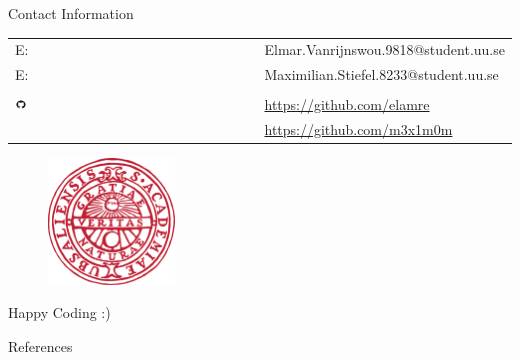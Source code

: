 \documentclass[apectratio=169]{beamer}
\begin{document}
\begin{frame}{Contact Information}
        	\begin{center}
                \begin{table}[]
                        \begin{tabular}{ll}
                                E: & Elmar.Vanrijnswou.9818@student.uu.se \\
                             	E: & Maximilian.Stiefel.8233@student.uu.se\\
            				& \\
			\includegraphics[width=0.05\textwidth]{./fig/github} & \url{https://github.com/elamre}\\ 
	& \url{https://github.com/m3x1m0m}
		
		\end{tabular}
                \end{table}

        	\end{center}
        	\begin{figure}
                	\includegraphics[width=0.3\textwidth]{./fig/logo}
        	\end{figure}
  	\end{frame}

\begin{frame}[standout]
	Happy Coding :) 
\end{frame}

\begin{frame}[allowframebreaks]{References}

  
  

\end{frame}
\end{document}
